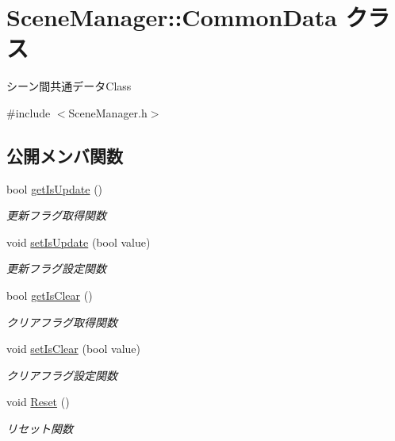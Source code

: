 \hypertarget{class_scene_manager_1_1_common_data}{}\section{Scene\+Manager\+:\+:Common\+Data クラス}
\label{class_scene_manager_1_1_common_data}


シーン間共通データ\+Class  




{\ttfamily \#include $<$Scene\+Manager.\+h$>$}

\subsection*{公開メンバ関数}
\begin{DoxyCompactItemize}
\item 
bool \mbox{\hyperlink{class_scene_manager_1_1_common_data_a2e9f26617f0f0ce25b7c2c99fdfadb9c}{get\+Is\+Update}} ()
\begin{DoxyCompactList}\small\item\em 更新フラグ取得関数 \end{DoxyCompactList}\item 
void \mbox{\hyperlink{class_scene_manager_1_1_common_data_acff0faeef41334781fc49184ada1a5a4}{set\+Is\+Update}} (bool value)
\begin{DoxyCompactList}\small\item\em 更新フラグ設定関数 \end{DoxyCompactList}\item 
bool \mbox{\hyperlink{class_scene_manager_1_1_common_data_a88aa3cc8dd3de9d2e10dc947ca06d397}{get\+Is\+Clear}} ()
\begin{DoxyCompactList}\small\item\em クリアフラグ取得関数 \end{DoxyCompactList}\item 
void \mbox{\hyperlink{class_scene_manager_1_1_common_data_a63ed55beac6b37243cafdbec26870fc3}{set\+Is\+Clear}} (bool value)
\begin{DoxyCompactList}\small\item\em クリアフラグ設定関数 \end{DoxyCompactList}\item 
void \mbox{\hyperlink{class_scene_manager_1_1_common_data_a32823be65c187b909e4159cef57931a9}{Reset}} ()
\begin{DoxyCompactList}\small\item\em リセット関数 \end{DoxyCompactList}\end{DoxyCompactItemize}
